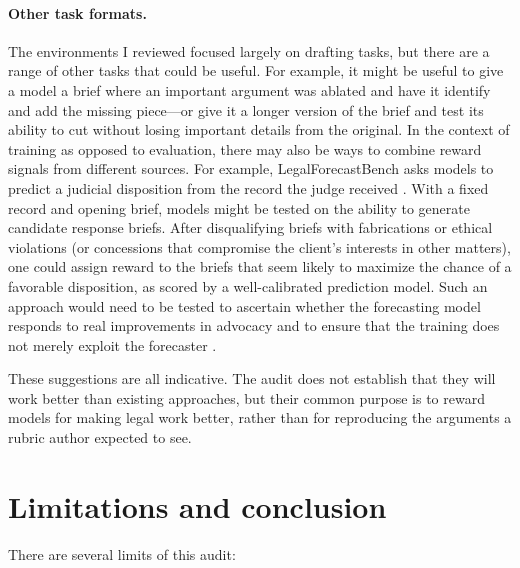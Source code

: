 \documentclass[11pt]{article}
\begin{document}
\paragraph{Other task formats.} The environments I reviewed focused largely on drafting tasks, but there are a range of other tasks that could be useful. For example, it might be useful to give a model a brief where an important argument was ablated and have it identify and add the missing piece---or give it a longer version of the brief and test its ability to cut without losing important details from the original. In the context of training as opposed to evaluation, there may also be ways to combine reward signals from different sources. For example, LegalForecastBench asks models to predict a judicial disposition from the record the judge received \citep{lfbpaper}. With a fixed record and opening brief, models might be tested on the ability to generate candidate response briefs. After disqualifying briefs with fabrications or ethical violations (or concessions that compromise the client's interests in other matters), one could assign reward to the briefs that seem likely to maximize the chance of a favorable disposition, as scored by a well-calibrated prediction model. Such an approach would need to be tested to ascertain whether the forecasting model responds to real improvements in advocacy and to ensure that the training does not merely exploit the forecaster \citep{gaoOveropt}.

These suggestions are all indicative. The audit does not establish that they will work better than existing approaches, but their common purpose is to reward models for making legal work better, rather than for reproducing the arguments a rubric author expected to see.

\section{Limitations and conclusion}
\label{sec:conclusion}

There are several limits of this audit:
\end{document}
